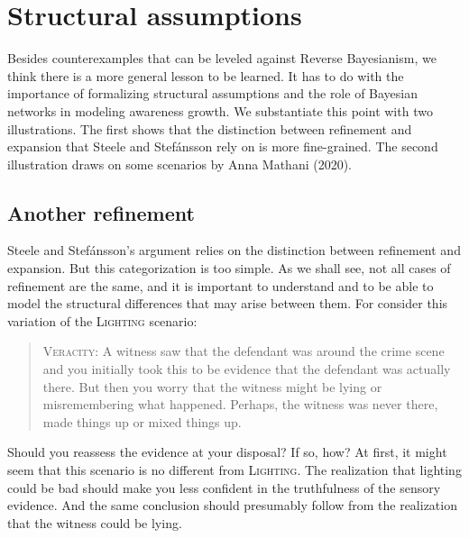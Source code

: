 \documentclass[
  11pt,
  dvipsnames,enabledeprecatedfontcommands]{scrartcl}
\begin{document}
\hypertarget{structural-assumptions}{%
\section{Structural assumptions}\label{structural-assumptions}}

\label{sec:structural-both}

Besides counterexamples that can be leveled against Reverse Bayesianism,
we think there is a more general lesson to be learned. It has to do with
the importance of formalizing structural assumptions and the role of
Bayesian networks in modeling awareness growth. We substantiate this
point with two illustrations. The first shows that the distinction
between refinement and expansion that Steele and Stefánsson rely on is
more fine-grained. The second illustration draws on some scenarios by
Anna Mathani (2020).

\hypertarget{another-refinement}{%
\subsection{Another refinement}\label{another-refinement}}

\label{sec:structural}

Steele and Stefánsson's argument relies on the distinction between
refinement and expansion. But this categorization is too simple. As we
shall see, not all cases of refinement are the same, and it is important
to understand and to be able to model the structural differences that
may arise between them. For consider this variation of the
\textsc{Lighting} scenario:

\begin{quote}
\textsc{Veracity}: A witness saw that the defendant was around the crime
scene and you initially took this to be evidence that the defendant was
actually there. But then you worry that the witness might be lying or
misremembering what happened. Perhaps, the witness was never there, made
things up or mixed things up.
\end{quote}

\doublespace

\noindent   Should you reassess the evidence at your disposal? If so,
how? At first, it might seem that this scenario is no different from
\textsc{Lighting}. The realization that lighting could be bad should
make you less confident in the truthfulness of the sensory evidence. And
the same conclusion should presumably follow from the realization that
the witness could be lying.
\end{document}
